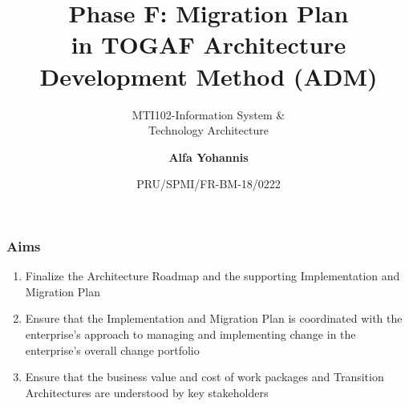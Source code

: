 \documentclass[aspectratio=169, table]{beamer}
\subtitle{MTI102-Information System \&\\Technology Architecture}
\title{\vskip-0.7cm \Large Phase F: Migration Plan\\in TOGAF
	Architecture\\Development Method (ADM)}
\date[Serial]{\scriptsize {PRU/SPMI/FR-BM-18/0222}}
\author[Pradita]{\small {\textbf{Alfa Yohannis}}}
\begin{document}
	\frame{\titlepage}

	\begin{frame}
		\frametitle{Aims}
		\begin{enumerate}
			\item Finalize the Architecture Roadmap and the supporting Implementation and Migration Plan
			\item Ensure that the Implementation and Migration Plan is coordinated with the enterprise’s approach to managing and implementing change in the enterprise’s overall change portfolio
			\item Ensure that the business value and cost of work packages and Transition Architectures are understood by key stakeholders
		\end{enumerate}
	\end{frame}
\end{document}
